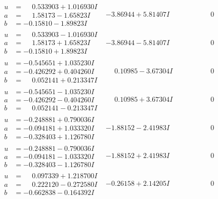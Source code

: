 \documentclass[1p]{elsarticle_modified}
\theoremstyle{definition}
\begin{document}
$$\begin{array}{c|c|c}
\begin{aligned}
u &= \phantom{-}0.533903 + 1.016930 I \\
a &= \phantom{-}1.58173 - 1.65823 I \\
b &= -0.15810 - 1.89823 I\end{aligned}
 & -3.86944 + 5.81407 I & \phantom{-0.000000 } 0 \\ \hline\begin{aligned}
u &= \phantom{-}0.533903 - 1.016930 I \\
a &= \phantom{-}1.58173 + 1.65823 I \\
b &= -0.15810 + 1.89823 I\end{aligned}
 & -3.86944 - 5.81407 I & \phantom{-0.000000 } 0 \\ \hline\begin{aligned}
u &= -0.545651 + 1.035230 I \\
a &= -0.426292 + 0.404260 I \\
b &= \phantom{-}0.052141 + 0.213347 I\end{aligned}
 & \phantom{-}0.10985 - 3.67304 I & \phantom{-0.000000 } 0 \\ \hline\begin{aligned}
u &= -0.545651 - 1.035230 I \\
a &= -0.426292 - 0.404260 I \\
b &= \phantom{-}0.052141 - 0.213347 I\end{aligned}
 & \phantom{-}0.10985 + 3.67304 I & \phantom{-0.000000 } 0 \\ \hline\begin{aligned}
u &= -0.248881 + 0.790036 I \\
a &= -0.094181 + 1.033320 I \\
b &= -0.328403 + 1.126780 I\end{aligned}
 & -1.88152 - 2.41983 I & \phantom{-0.000000 } 0 \\ \hline\begin{aligned}
u &= -0.248881 - 0.790036 I \\
a &= -0.094181 - 1.033320 I \\
b &= -0.328403 - 1.126780 I\end{aligned}
 & -1.88152 + 2.41983 I & \phantom{-0.000000 } 0 \\ \hline\begin{aligned}
u &= \phantom{-}0.097339 + 1.218700 I \\
a &= \phantom{-}0.222120 - 0.272580 I \\
b &= -0.662838 - 0.164392 I\end{aligned}
 & -0.26158 + 2.14205 I & \phantom{-0.000000 } 0 \\ \hline\begin{aligned}

\end{aligned}
\end{array}$$
\end{document}
